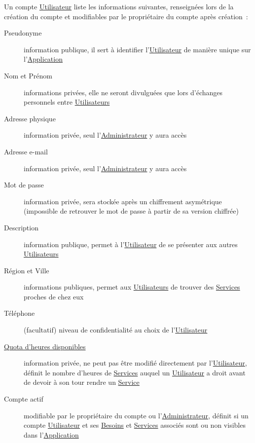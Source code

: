 \documentclass[french]{article}
\begin{document}
			Un compte \hyperlink{utilisateur}{Utilisateur} liste les informations
			 suivantes, renseignées lors de la création du compte et modifiables par
			 le propriétaire du compte après création :
			\begin{description}
				\item [Pseudonyme]
					information publique, il sert à identifier
					 l’\hyperlink{utilisateur}{Utilisateur} de manière unique sur
					 l’\hyperlink{application}{Application}
				\item [Nom et Prénom]
					informations privées, elle ne seront divulguées que lors d’échanges
					 personnels entre \hyperlink{utilisateur}{Utilisateurs}
				\item [Adresse physique]
					information privée, seul l’\hyperlink{administrateur}{Administrateur}
					 y aura accès
				\item [Adresse e-mail]
					information privée, seul l’\hyperlink{administrateur}{Administrateur}
					 y aura accès
				\item [Mot de passe]
					information privée, sera stockée après un chiffrement asymétrique
					 (impossible de retrouver le mot de passe à partir de sa version
					 chiffrée)
				\item [Description]
					information publique, permet à l’\hyperlink{utilisateur}{Utilisateur}
					 de se présenter aux autres \hyperlink{utilisateur}{Utilisateurs}
				\item [Région et Ville]
					informations publiques, permet aux
					 \hyperlink{utilisateur}{Utilisateurs} de trouver des
					 \hyperlink{service}{Services} proches de chez eux
				\item [Téléphone]
					(facultatif) niveau de confidentialité au choix de
					 l’\hyperlink{utilisateur}{Utilisateur}
				\item [\hyperlink{quota}{Quota d’heures disponibles}]
					information privée, ne peut pas être modifié directement par
					 l’\hyperlink{utilisateur}{Utilisateur}, définit le nombre d’heures de
					 \hyperlink{service}{Services} auquel un
					 \hyperlink{utilisateur}{Utilisateur} a droit avant de devoir à son
					 tour rendre un \hyperlink{service}{Service}
				\item [Compte actif]
					modifiable par le propriétaire du compte ou
					 l’\hyperlink{administrateur}{Administrateur}, définit si un compte
					 \hyperlink{utilisateur}{Utilisateur} et ses
					 \hyperlink{besoin}{Besoins} et \hyperlink{service}{Services} associés
					 sont ou non visibles dans l’\hyperlink{application}{Application}
			\end{description}
			
\end{document}
